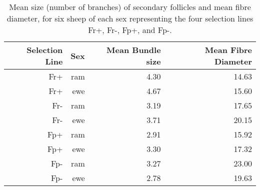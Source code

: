 \begin{table}[ht]
\centering
\caption{Mean size (number of branches) of secondary follicles and mean fibre diameter, for six sheep of each sex representing the four selection lines Fr+, Fr-, Fp+, and Fp-.} 
\vspace{0.1in}
\label{tab:meansize}
\begin{tabular}{rrrr}
  \hline
  Selection Line & Sex & Mean Bundle size & Mean Fibre Diameter  \\ 
  \hline
   Fr+ & ram &  4.30 & 14.63  \\ 
   Fr+ & ewe & 4.67  & 15.60   \\ \hline
   Fr- & ram &  3.19 &  17.65   \\
   Fr- & ewe &  3.71 &  20.15   \\ \hline
   Fp+ & ram &  2.91 &  15.92   \\
   Fp+ & ewe  & 3.30 &  17.32   \\ \hline
   Fp- & ram  & 3.27 &  23.00   \\
   Fp- & ewe  & 2.78 & 19.63   \\ 
   \hline
\end{tabular}
\end{table}

